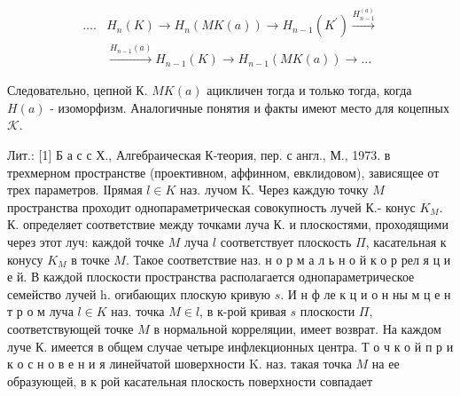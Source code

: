 \documentclass[10pt]{article}
\begin{document}
\[

\begin{aligned}

\ldots . & H_{n}(K) \rightarrow H_{n}(M K(a)) \rightarrow H_{n-1}\left(K^{\prime}\right) \stackrel{H_{n-1}^{(a)}}{\longrightarrow} \\

& \stackrel{H_{n-1}(a)}{\longrightarrow} H_{n-1}(K) \longrightarrow H_{n-1}(M K(a)) \longrightarrow \ldots

\end{aligned}

\]



Следовательно, цепной К. $M K(a)$ ацикличен тогда и только тогда, когда $H(a)$ - изоморфизм. Аналогичные понятия и факты имеют место для коцепных $\mathcal{K}$.



Лит.: [1] Б а с с Х., Алгебраическая К-теория, пер. с англ., М., 1973. в трехмерном пространстве (проективном, аффинном, евклидовом), зависящее от трех параметров. ІІрямая $l \in K$ наз. лучом $\mathrm{K}$. Через каждую точку $M$ пространства проходит однопараметрическая совокупность лучей К.- конус $K_{M}$. К. определяет соответствие между точками луча К. и плоскостями, проходящими через этот луч: каждой точке $M$ луча $l$ соответствует плоскость $\Pi$, касательная к конусу $K_{M}$ в точке $M$. Такое соответствие наз. н о р м а л ь н о й к о р рел я ц и е й. В каждой плоскости пространства располагается однопараметрическое семейство лучей $\mathrm{h}$. огибающих плоскую кривую $s$. И н ф ле к ц и о н ны м ц е н т р о м луча $l \in K$ наз. точка $M \in l$, в к-рой кривая $s$ плоскости $\Pi$, соответствующей точке $M$ в нормальной корреляции, имеет возврат. На каждом луче К. имеется в общем случае четыре инфлекционных центра. Т о ч к о й п р и к о с н о в е н и я линейчатой шоверхности K. наз. такая точка $M$ на ее образующей, в к рой касательная плоскость поверхности совпадает
\end{document}
